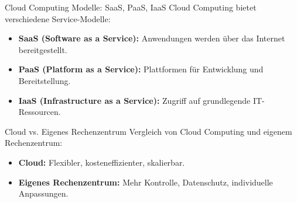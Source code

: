\documentclass{beamer}
\begin{document}
\begin{frame}{Cloud Computing Modelle: SaaS, PaaS, IaaS}
    Cloud Computing bietet verschiedene Service-Modelle:
    \begin{itemize}
        \item \textbf{SaaS (Software as a Service):} Anwendungen werden über das Internet bereitgestellt.
        \item \textbf{PaaS (Platform as a Service):} Plattformen für Entwicklung und Bereitstellung.
        \item \textbf{IaaS (Infrastructure as a Service):} Zugriff auf grundlegende IT-Ressourcen.
    \end{itemize}
\end{frame}

\begin{frame}{Cloud vs. Eigenes Rechenzentrum}
    Vergleich von Cloud Computing und eigenem Rechenzentrum:
    \begin{itemize}
        \item \textbf{Cloud:} Flexibler, kosteneffizienter, skalierbar.
        \item \textbf{Eigenes Rechenzentrum:} Mehr Kontrolle, Datenschutz, individuelle Anpassungen.
    \end{itemize}
\end{frame}
\end{document}
